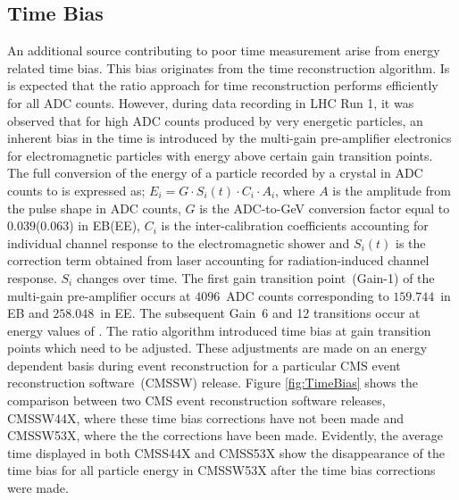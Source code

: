 \subsection{Time Bias}
An additional source contributing to poor time measurement arise from energy related time bias. This bias originates from the time reconstruction algorithm. Is is expected that the ratio approach for time reconstruction performs efficiently for all ADC counts. However, during data recording in LHC Run 1, it was observed that for high ADC counts produced by very energetic particles, an inherent bias in the time is introduced by the multi-gain pre-amplifier electronics for electromagnetic particles with energy above certain gain transition points. 
The full conversion of the energy of a particle recorded by a crystal in ADC counts to \GeV is expressed as; $    E_{i} =  G \cdot S_{i}(t) \cdot C_{i} \cdot A_{i}$, where $A$ is the amplitude from the pulse shape in ADC counts, $G$ is the ADC-to-GeV conversion factor equal to $0.039$($0.063$) in EB(EE), $C_{i}$ is the inter-calibration coefficients accounting for individual channel response to the electromagnetic shower and $S_{i}(t)$ is the correction term obtained from laser accounting for radiation-induced channel response.  $S_{i}$ changes over time.
The first gain transition point~(Gain-1) of the multi-gain pre-amplifier occurs at $4096$~ADC counts corresponding to $159.744$~\GeV in EB and $258.048$~\GeV in EE. The subsequent Gain~6 and 12 transitions occur at energy values of \TeV.
\newline
The ratio algorithm introduced time bias at gain transition points which need to be adjusted.
These adjustments are made on an energy dependent basis during event reconstruction for a particular CMS event reconstruction software~(CMSSW) release. Figure \ref{fig:TimeBias} shows the comparison between two CMS event reconstruction software releases, CMSSW44X, where these time bias corrections have not been  made and CMSSW53X, where the the corrections have been made. Evidently, the average time displayed in both CMSS44X and CMSS53X show the disappearance of the time bias for all particle energy in CMSSW53X after the time bias corrections were made.
